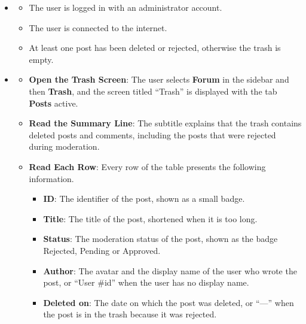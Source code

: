 
\begin{itemize}[leftmargin=1.6em,topsep=4pt,itemsep=3pt,parsep=0pt,label=$\bullet$]
    \item {}
        \begin{itemize}[leftmargin=2.2em,topsep=2pt,itemsep=3pt,parsep=0pt,label=$\circ$]
            \item The user is logged in with an administrator account.
            \item The user is connected to the internet.
            \item At least one post has been deleted or rejected, otherwise the trash is empty.
        \end{itemize}
    \item {}
        \begin{itemize}[leftmargin=2.2em,topsep=2pt,itemsep=3pt,parsep=0pt,label=$\circ$]
            \item \textbf{Open the Trash Screen}: The user selects \textbf{Forum} in the sidebar and then \textbf{Trash}, and the screen titled ``Trash'' is displayed with the tab \textbf{Posts} active.
            \item \textbf{Read the Summary Line}: The subtitle explains that the trash contains deleted posts and comments, including the posts that were rejected during moderation.
            \item \textbf{Read Each Row}: Every row of the table presents the following information.
                \begin{itemize}[leftmargin=2.2em,topsep=2pt,itemsep=3pt,parsep=0pt,label=$\blacksquare$]
                    \item \textbf{ID}: The identifier of the post, shown as a small badge.
                    \item \textbf{Title}: The title of the post, shortened when it is too long.
                    \item \textbf{Status}: The moderation status of the post, shown as the badge Rejected, Pending or Approved.
                    \item \textbf{Author}: The avatar and the display name of the user who wrote the post, or ``User \#id'' when the user has no display name.
                    \item \textbf{Deleted on}: The date on which the post was deleted, or ``---'' when the post is in the trash because it was rejected.

\end{itemize}
\end{itemize}
\end{itemize}
